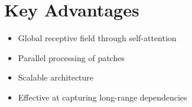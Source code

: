 \documentclass{article}
\begin{document}
\section{Key Advantages}
\begin{itemize}
    \item Global receptive field through self-attention
    \item Parallel processing of patches
    \item Scalable architecture
    \item Effective at capturing long-range dependencies
\end{itemize}
\end{document}
